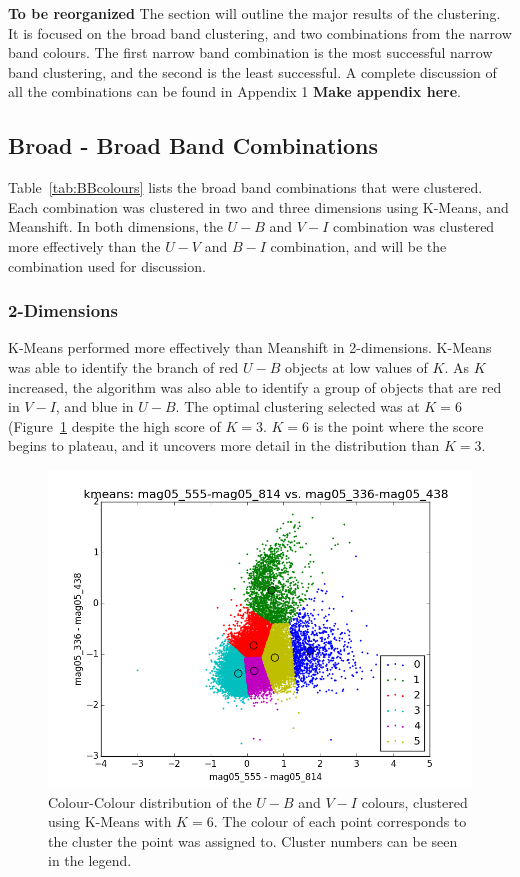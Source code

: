 
\textbf{To be reorganized}
The section will outline the major results of the clustering. 
It is focused on the broad band clustering, and two combinations from the narrow band colours.
The first narrow band combination is the most successful narrow band clustering, and the second is the least successful.
A complete discussion of all the combinations can be found in Appendix 1 \textbf{Make appendix here}.

\subsection{Broad - Broad Band Combinations}
Table~\ref{tab:BBcolours} lists the broad band combinations that were clustered. 
Each combination was clustered in two and three dimensions using K-Means, and Meanshift.
In both dimensions, the $U - B$ and $V - I$ combination was clustered more effectively than the $U - V$ and $B - I$ combination, and will be the combination used for discussion.

\subsubsection{2-Dimensions}
K-Means performed more effectively than Meanshift in 2-dimensions.
K-Means was able to identify the branch of red $U - B$ objects at low values of $K$.
As $K$ increased, the algorithm was also able to identify a group of objects that are red in $V - I$, and blue in $U - B$. 
The optimal clustering selected was at $K=6$ (Figure~\ref{fig:KMBB6} despite the high score of $K=3$.
$K=6$ is the point where the score begins to plateau, and it uncovers more detail in the distribution than $K=3$.

\begin{figure}[H]
\centering
\includegraphics[width=\linewidth]{figs/kmeans_col_6cl_mag05_555-mag05_814vsmag05_336-mag05_438}
\caption{Colour-Colour distribution of the $U - B$ and $V - I$ colours, clustered using K-Means with $K=6$. The colour of each point corresponds to the cluster the point was assigned to. Cluster numbers can be seen in the legend.}
\label{fig:KMBB6}
\end{figure}

